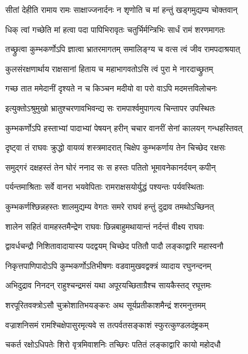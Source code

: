 \twolineshloka
{सीतां देहीति रामाय रामः साक्षाज्जनार्दनः}
{न शृणोति च मां हन्तुं खड्गमुद्यम्य चोक्तवान्} %

\twolineshloka
{धिक् त्वां गच्छेति मां हत्वा पदा पापिभिरावृतः}
{चतुर्भिर्मन्त्रिभिः सार्धं रामं शरणमागतः} %

\twolineshloka
{तच्छ्रुत्वा कुम्भकर्णोऽपि ज्ञात्वा भ्रातरमागतम्}
{समालिङ्ग्य च वत्स त्वं जीव रामपदाश्रयात्} %

\twolineshloka
{कुलसंरक्षणार्थाय राक्षसानां हिताय च}
{महाभागवतोऽसि त्वं पुरा मे नारदाच्छ्रुतम्} %

\twolineshloka
{गच्छ तात ममेदानीं दृश्यते न च किञ्चन}
{मदीयो वा परो वाऽपि मदमत्तविलोचनः} %

\twolineshloka
{इत्युक्तोऽश्रुमुखो भ्रातुश्चरणावभिवन्द्य सः}
{रामपार्श्वमुपागत्य चिन्तापर उपस्थितः} %

\twolineshloka
{कुम्भकर्णोऽपि हस्ताभ्यां पादाभ्यां पेषयन् हरीन्}
{चचार वानरीं सेनां कालयन् गन्धहस्तिवत्} %

\twolineshloka
{दृष्ट्वा तं राघवः क्रुद्धो वायव्यं शस्त्रमादरात्}
{चिक्षेप कुम्भकर्णाय तेन चिच्छेद रक्षसः} %

\twolineshloka
{समुद्गरं दक्षहस्तं तेन घोरं ननाद सः}
{स हस्तः पतितो भूमावनेकानर्दयन् कपीन्} %

\twolineshloka
{पर्यन्तमाश्रिताः सर्वे वानरा भयवेपिताः}
{रामराक्षसयोर्युद्धं पश्यन्तः पर्यवस्थिताः} %

\twolineshloka
{कुम्भकर्णश्छिन्नहस्तः शालमुद्यम्य वेगतः}
{समरे राघवं हन्तुं दुद्राव तमथोऽच्छिनत्} %

\twolineshloka
{शालेन सहितं वामहस्तमैन्द्रेण राघवः}
{छिन्नबाहुमथायान्तं नर्दन्तं वीक्ष्य राघवः} %

\twolineshloka
{द्वावर्धचन्द्रौ निशितावादायास्य पदद्वयम्}
{चिच्छेद पतितौ पादौ लङ्काद्वारि महास्वनौ} %

\twolineshloka
{निकृत्तपाणिपादोऽपि कुम्भकर्णोऽतिभीषणः}
{वडवामुखवद्वक्त्रं व्यादाय रघुनन्दनम्} %

\twolineshloka
{अभिदुद्राव निनदन् राहुश्चन्द्रमसं यथा}
{अपूरयच्छिताग्रैश्च सायकैस्तद् रघूत्तमः} %

\twolineshloka
{शरपूरितवक्त्रोऽसौ चुक्रोशातिभयङ्करः}
{अथ सूर्यप्रतीकाशमैन्द्रं शरमनुत्तमम्} %

\twolineshloka
{वज्राशनिसमं रामश्चिक्षेपासुरमृत्यवे}
{स तत्पर्वतसङ्काशं स्फुरत्कुण्डलदंष्ट्रकम्} %

\twolineshloka
{चकर्त रक्षोऽधिपतेः शिरो वृत्रमिवाशनिः}
{तच्छिरः पतितं लङ्काद्वारि कायो महोदधौ} %


